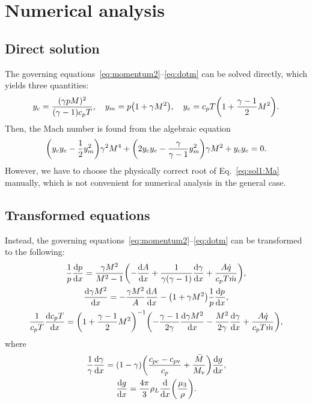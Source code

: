 \documentclass{article}
\newcommand{\vap}{\text{v}}
\newcommand{\con}{\text{c}}
\begin{document}
\section{Numerical analysis}

\subsection{Direct solution}

The governing equations~\eqref{eq:momentum2}--\eqref{eq:dotm} can be solved directly, which yields three quantities:
\begin{equation}\label{eq:sol1:y}
    y_c = \frac{(\gamma pM)^2}{(\gamma-1)c_pT}, \quad
    y_m = p\qty(1 + \gamma M^2), \quad
    y_e = c_pT\qty(1 + \frac{\gamma-1}{2}M^2).
\end{equation}
Then, the Mach number is found from the algebraic equation
\begin{equation}\label{eq:sol1:Ma}
    \qty(y_c y_e - \frac12y_m^2)\gamma^2M^4 + \qty(2y_c y_e - \frac{\gamma}{\gamma-1}y_m^2)\gamma M^2 + y_cy_e = 0.
\end{equation}
However, we have to choose the physically correct root of Eq.~\eqref{eq:sol1:Ma} manually,
which is not convenient for numerical analysis in the general case.

\subsection{Transformed equations}

Instead, the governing equations~\eqref{eq:momentum2}--\eqref{eq:dotm} can be transformed to the following:
\begin{gather}
    \frac1p\dv{p}{x} = \frac{\gamma M^2}{M^2 - 1}
        \qty( -\dv{A}{x} + \frac1{\gamma(\gamma-1)}\dv{\gamma}{x} + \frac{A\dot{q}}{c_pT\dot{m}}), \label{eq:sol2:p}\\
    \dv{\gamma M^2}{x} =
        -\frac{\gamma M^2}{A}\dv{A}{x} - \qty(1 + \gamma M^2)\frac1p\dv{p}{x}, \label{eq:sol2:Ma}\\
    \frac1{c_pT}\dv{c_pT}{x} = \qty(1+\frac{\gamma-1}{2}M^2)^{-1}
        \qty( -\frac{\gamma-1}{2\gamma}\dv{\gamma M^2}{x}
            - \frac{M^2}{2\gamma}\dv{\gamma}{x} + \frac{A\dot{q}}{c_pT\dot{m}}), \label{eq:sol2:T}
\end{gather}
where
\begin{gather}
    \frac1\gamma\dv{\gamma}{x}
        = (1-\gamma)\qty(\frac{c_{p\con} - c_{p\vap}}{c_p} + \frac{\bar{M}}{M_\vap})\dv{g}{x}, \label{eq:gamma_prime}\\
    \dv{g}{x} = \frac{4\pi}{3}\rho_L\dv{x}(\frac{\mu_3}{\rho}). \label{eq:g_prime}
\end{gather}

\printbibliography
\end{document}
